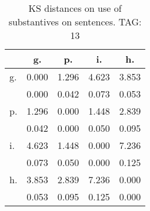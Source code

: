 \begin{table}[h!]
\begin{center}
\begin{tabular}{| l | c | c | c | c |}\hline
 & g. & p. & i. & h. \\\hline
g. & 0.000  & 1.296  & 4.623  & 3.853 \\\hline
 & 0.000  & 0.042  & 0.073  & 0.053 \\\hline
p. & 1.296  & 0.000  & 1.448  & 2.839 \\\hline
 & 0.042  & 0.000  & 0.050  & 0.095 \\\hline
i. & 4.623  & 1.448  & 0.000  & 7.236 \\\hline
 & 0.073  & 0.050  & 0.000  & 0.125 \\\hline
h. & 3.853  & 2.839  & 7.236  & 0.000 \\\hline
 & 0.053  & 0.095  & 0.125  & 0.000 \\\hline
\end{tabular}
\caption{KS distances on use of substantives on sentences. TAG: 13}
\end{center}
\end{table}